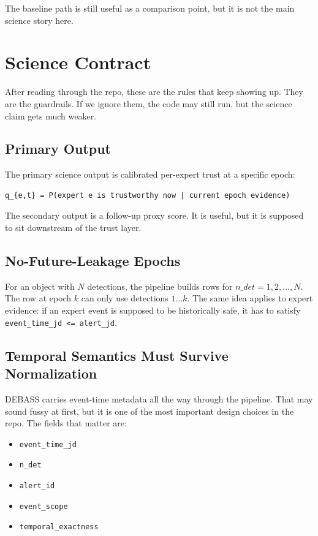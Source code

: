 \documentclass[11pt]{article}
\newcommand{\code}[1]{\texttt{#1}}
\begin{document}
The baseline path is still useful as a comparison point, but it is not the main science story here.

\section{Science Contract}

After reading through the repo, these are the rules that keep showing up. They are the guardrails. If we ignore them, the code may still run, but the science claim gets much weaker.

\subsection{Primary Output}

The primary science output is calibrated per-expert trust at a specific epoch:

\begin{verbatim}
q_{e,t} = P(expert e is trustworthy now | current epoch evidence)
\end{verbatim}

The secondary output is a follow-up proxy score. It is useful, but it is supposed to sit downstream of the trust layer.

\subsection{No-Future-Leakage Epochs}

For an object with $N$ detections, the pipeline builds rows for $n\_det = 1, 2, \dots, N$. The row at epoch $k$ can only use detections $1 \dots k$. The same idea applies to expert evidence: if an expert event is supposed to be historically safe, it has to satisfy \code{event\_time\_jd <= alert\_jd}.

\subsection{Temporal Semantics Must Survive Normalization}

DEBASS carries event-time metadata all the way through the pipeline. That may sound fussy at first, but it is one of the most important design choices in the repo. The fields that matter are:

\begin{itemize}
\item \code{event\_time\_jd}
\item \code{n\_det}
\item \code{alert\_id}
\item \code{event\_scope}
\item \code{temporal\_exactness}
\end{itemize}
\end{document}
